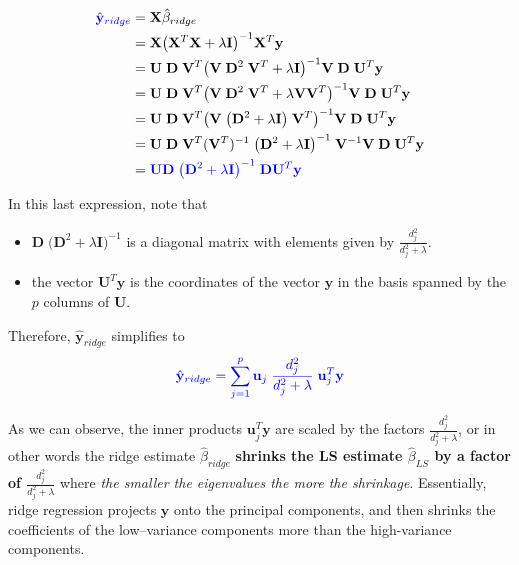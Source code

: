 \documentclass[
]{book}
\begin{document}
\begin{align*}
{\color{blue}{\hat{\mathbf{y}}_{ridge}}} &= \mathbf{X} \hat{\beta}_{ridge}\\
&= \mathbf{X} \bigl(\mathbf{X}^T \mathbf{X} + \lambda \mathbf{I} \bigr)^{-1} \mathbf{X}^T \mathbf{y}\\
&= \mathbf{U}\;\mathbf{D}\;\mathbf{V}^T \bigl(  \mathbf{V}\; \mathbf{D}^2\; \mathbf{V}^T + \lambda \mathbf{I} \bigr)^{-1}\mathbf{V}\;\mathbf{D}\;\mathbf{U}^T  \mathbf{y}\\
&= \mathbf{U}\;\mathbf{D}\;\mathbf{V}^T \bigl(  \mathbf{V}\; \mathbf{D}^2\; \mathbf{V}^T + \lambda \mathbf{V}\mathbf{V}^T \bigr)^{-1}\mathbf{V}\;\mathbf{D}\;\mathbf{U}^T  \mathbf{y}\\
&= \mathbf{U}\;\mathbf{D}\;\mathbf{V}^T \bigl(  \mathbf{V}\; \bigl( \mathbf{D}^2 + \lambda \mathbf{I} \bigr)\;  \mathbf{V}^T \bigr)^{-1}\mathbf{V}\;\mathbf{D}\;\mathbf{U}^T  \mathbf{y}\\
&= \mathbf{U}\;\mathbf{D}\;\mathbf{V}^T (\mathbf{V}^T)^{-1}\; \bigl( \mathbf{D}^2 + \lambda \mathbf{I} \bigr)^{-1}\;  \mathbf{V}^{-1}\mathbf{V}\;\mathbf{D}\;\mathbf{U}^T  \mathbf{y}\\
&= {\color{blue}{\mathbf{U}\mathbf{D}\;\bigl( \mathbf{D}^2 + \lambda \mathbf{I} \bigr)^{-1}\; \mathbf{D}\mathbf{U}^T  \mathbf{y}}}
\end{align*}

In this last expression, note that

\begin{itemize}
\item
  \(\mathbf{D}\;\bigl( \mathbf{D}^2 + \lambda \mathbf{I} \bigr)^{-1}\) is a diagonal matrix with elements given by \(\frac{d_j^2}{d_j^2 + \lambda}\).
\item
  the vector \(\mathbf{U}^T  \mathbf{y}\) is the coordinates of the vector \(\mathbf{y}\) in the basis spanned by the \(p\) columns of \(\mathbf{U}\).
\end{itemize}

Therefore, \(\hat{\mathbf{y}}_{ridge}\) simplifies to
\[{\color{blue}{\hat{\mathbf{y}}_{ridge} = \sum_{j=1}^{p} \mathbf{u}_j \;  \frac{d_j^2}{d_j^2 + \lambda}  \; \mathbf{u}_j^T \mathbf{y}}}\]

As we can observe, the inner products \(\mathbf{u}_j^T \mathbf{y}\) are scaled by the factors \(\frac{d_j^2}{d_j^2 + \lambda}\), or in other words the ridge estimate \(\hat{\beta}_{ridge}\) \textbf{shrinks the LS estimate \(\hat{\beta}_{LS}\) by a factor of \(\frac{d_j^2}{d_j^2 + \lambda}\)} where \emph{the smaller the eigenvalues the more the shrinkage}. Essentially, ridge regression projects \(\mathbf{y}\) onto the principal components, and then shrinks the coefficients of the low--variance components more than the high-variance components.
\end{document}
